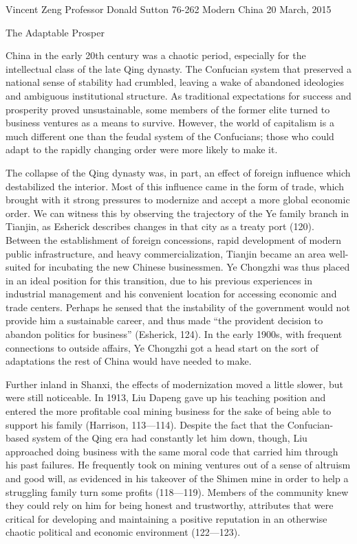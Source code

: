 Vincent Zeng
Professor Donald Sutton
76-262 Modern China
20 March, 2015

The Adaptable Prosper

China in the early 20th century was a chaotic period, especially for the
intellectual class of the late Qing dynasty.  The Confucian system that
preserved a national sense of stability had crumbled, leaving a wake of
abandoned ideologies and ambiguous institutional structure. As traditional
expectations for success and prosperity proved unsustainable, some members
of the former elite turned to business ventures as a means to survive.
However, the world of capitalism is a much different one than the feudal
system of the Confucians; those who could adapt to the rapidly changing
order were more likely to make it.

The collapse of the Qing dynasty was, in part, an effect of foreign
influence which destabilized the interior. Most of this influence came
in the form of trade, which brought with it strong pressures to
modernize and accept a more global economic order. We can witness this
by observing the trajectory of the Ye family branch in Tianjin, as
Esherick describes changes in that city as a treaty port (120).  Between
the establishment of foreign concessions, rapid development of modern
public infrastructure, and heavy commercialization, Tianjin became an
area well-suited for incubating the new Chinese businessmen. Ye Chongzhi
was thus placed in an ideal position for this transition, due to his
previous experiences in industrial management and his convenient
location for accessing economic and trade centers. Perhaps he sensed
that the instability of the government would not provide him a
sustainable career, and thus made “the provident decision to abandon
politics for business” (Esherick, 124). In the early 1900s, with
frequent connections to outside affairs, Ye Chongzhi got a head start on
the sort of adaptations the rest of China would have needed to make.

Further inland in Shanxi, the effects of modernization moved a
little slower, but were still noticeable. In 1913, Liu Dapeng gave
up his teaching position and entered the more profitable coal mining
business for the sake of being able to support his family (Harrison,
113—114). Despite the fact that the Confucian-based system of the
Qing era had constantly let him down, though, Liu approached doing
business with the same moral code that carried him through his past
failures. He frequently took on mining ventures out of a sense of
altruism and good will, as evidenced in his takeover of the Shimen
mine in order to help a struggling family turn some profits
(118—119). Members of the community knew they could rely on him for
being honest and trustworthy, attributes that were critical for
developing and maintaining a positive reputation in an otherwise
chaotic political and economic environment (122—123).

